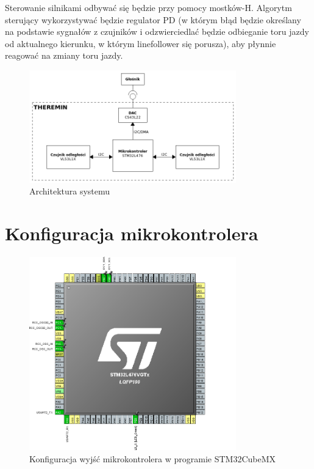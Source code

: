 \documentclass[10pt, a4paper]{article}
\begin{document}
Sterowanie silnikami odbywać się będzie przy pomocy mostków-H. Algorytm sterujący wykorzystywać będzie regulator PD (w którym błąd będzie określany na podstawie sygnałów z czujników i odzwierciedlać będzie odbieganie toru jazdy od aktualnego kierunku, w którym linefollower się porusza), aby płynnie reagować na zmiany toru jazdy.
\begin{figure}[H]
	\centering
	\includegraphics[width=0.8\textwidth]{architektura.png}
	\caption{Architektura systemu}
	\label{fig:Architektura}
\end{figure}



 
\section{Konfiguracja mikrokontrolera}

\begin{figure}[H]
	\centering
	\includegraphics[width=0.8\textwidth]{konfiguracja_mcu.png}
	\caption{Konfiguracja wyjść mikrokontrolera w programie STM32CubeMX}
	\label{fig:KonfiguracjaMikrokontrolera}
\end{figure}
\end{document}
